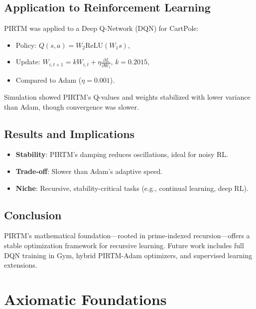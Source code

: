 \documentclass{article}
\theoremstyle{plain}
\begin{document}
\subsection{Application to Reinforcement Learning}
PIRTM was applied to a Deep Q-Network (DQN) for CartPole:
\begin{itemize}
    \item Policy: \( Q(s, a) = W_2 \text{ReLU}(W_1 s) \),
    \item Update: \( W_{i,t+1} = k W_{i,t} + \eta \frac{\partial L}{\partial W_i} \), \( k = 0.2015 \),
    \item Compared to Adam (\( \eta = 0.001 \)).
\end{itemize}
Simulation showed PIRTM’s Q-values and weights stabilized with lower variance than Adam, though convergence was slower.

\subsection{Results and Implications}
\begin{itemize}
    \item \textbf{Stability}: PIRTM’s damping reduces oscillations, ideal for noisy RL.
    \item \textbf{Trade-off}: Slower than Adam’s adaptive speed.
    \item \textbf{Niche}: Recursive, stability-critical tasks (e.g., continual learning, deep RL).
\end{itemize}

\subsection{Conclusion}
PIRTM’s mathematical foundation—rooted in prime-indexed recursion—offers a stable optimization framework for recursive learning. Future work includes full DQN training in Gym, hybrid PIRTM-Adam optimizers, and supervised learning extensions.


\section{Axiomatic Foundations}
\end{document}
